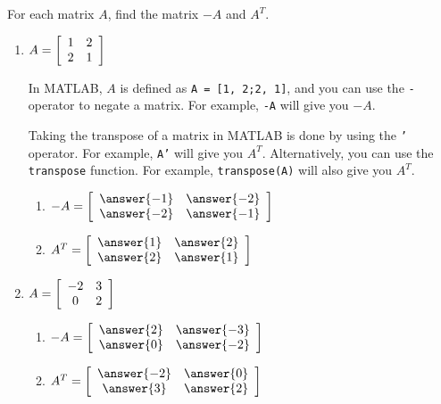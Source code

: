 \documentclass{ximera}
\author{Zack Reed}
\begin{document}
\begin{exercise}
  For each matrix $A$, find the matrix $-A$ and $A^T$.
  \begin{enumerate}
    \item
    $A = \startmat{cc}
      1 & 2 \\
      2 & 1
    \stopmat$

    \begin{hint}
    
      In MATLAB, $A$ is defined as \texttt{A = [1, 2;2, 1]}, and you can use the \texttt{-} operator to negate a matrix. For example, \texttt{-A} will give you $-A$.

      Taking the transpose of a matrix in MATLAB is done by using the \texttt{'} operator. For example, \texttt{A'} will give you $A^T$. Alternatively, you can use the \texttt{transpose} function. For example, \texttt{transpose(A)} will also give you $A^T$.



    \end{hint}


    \begin{enumerate}
      \item $-A = 
      \startmat{cc}
      \answer{-1} & \answer{-2} \\
      \answer{-2} & \answer{-1}
      \stopmat$

      \item $A^T =
      \startmat{cc}
      \answer{1} & \answer{2} \\
      \answer{2} & \answer{1}
      \stopmat$
    \end{enumerate}
  
\item
    $A = \startmat{cc}
      -2 & 3 \\
      0 & 2
    \stopmat$

    \begin{enumerate}
      \item $-A = 
      \startmat{cc}
      \answer{2} & \answer{-3} \\
      \answer{0} & \answer{-2}
      \stopmat$

      \item $A^T =
      \startmat{cc}
      \answer{-2} & \answer{0} \\
      \answer{3} & \answer{2}
      \stopmat$
    \end{enumerate}


\end{enumerate}
\end{exercise}
\end{document}
